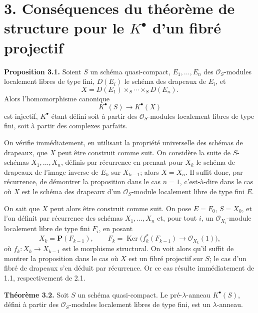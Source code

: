 \documentclass[11pt]{article}
\providecommand{\Ker}{\operatorname{Ker}}
\begin{document}
\section*{3. Conséquences du théorème de structure pour le \(K^\bullet\) d'un fibré projectif}

\textbf{Proposition 3.1.} Soient \(S\) un schéma quasi-compact, \(E_1,\ldots,E_n\) des \(\mathcal O_S\)-modules localement libres de type fini, \(D(E_i)\) le schéma des drapeaux de \(E_i\), et
\[
  X=D(E_1)\times_S\cdots\times_S D(E_n).
\]
Alors l'homomorphisme canonique
\[
  K^\bullet(S)\longrightarrow K^\bullet(X)
\]
est injectif, \(K^\bullet\) étant défini soit à partir des \(\mathcal O_S\)-modules localement libres de type fini, soit à partir des complexes parfaits.

On vérifie immédiatement, en utilisant la propriété universelle des schémas de drapeaux, que \(X\) peut être construit comme suit. On considère la suite de \(S\)-schémas \(X_1,\ldots,X_n\), définis par récurrence en prenant pour \(X_k\) le schéma de drapeaux de l'image inverse de \(E_k\) sur \(X_{k-1}\); alors \(X=X_n\). Il suffit donc, par récurrence, de démontrer la proposition dans le cas \(n=1\), c'est-à-dire dans le cas où \(X\) est le schéma des drapeaux d'un \(\mathcal O_S\)-module localement libre de type fini \(E\).

On sait que \(X\) peut alors être construit comme suit. On pose \(E=F_0\), \(S=X_0\), et l'on définit par récurrence des schémas \(X_1,\ldots,X_n\) et, pour tout \(i\), un \(\mathcal O_{X_i}\)-module localement libre de type fini \(F_i\), en posant
\[
  X_k=\mathbf P(F_{k-1}),\qquad
  F_k=\Ker\bigl(f_k^*(F_{k-1})\longrightarrow\mathcal O_{X_k}(1)\bigr),
\]
où \(f_k:X_k\to X_{k-1}\) est le morphisme structural. On voit alors qu'il suffit de montrer la proposition dans le cas où \(X\) est un fibré projectif sur \(S\); le cas d'un fibré de drapeaux s'en déduit par récurrence. Or ce cas résulte immédiatement de 1.1, respectivement de 2.1.

\textbf{Théorème 3.2.} Soit \(S\) un schéma quasi-compact. Le pré-\(\lambda\)-anneau \(K^\bullet(S)\), défini à partir des \(\mathcal O_S\)-modules localement libres de type fini, est un \(\lambda\)-anneau.
\end{document}
